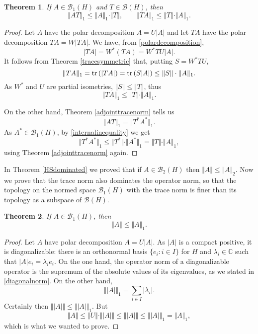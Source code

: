 \documentclass{article}
\newcommand{\tr}{\ensuremath\mathrm{tr}\,}
\newcommand{\norm}[1]{\Vert #1 \Vert}
\newtheorem{theorem}{Theorem}
\begin{document}
\begin{theorem}
If $A \in \mathscr{B}_1(H)$ and $T \in \mathscr{B}(H)$, then
\[
\norm{AT}_1 \leq \norm{A}_1 \cdot \norm{T}, \qquad \norm{TA}_1 \leq \norm{T} \cdot \norm{A}_1.
\]
\end{theorem}
\begin{proof}
Let $A$ have the polar decomposition $A=U|A|$ and let $TA$ have the polar decomposition
$TA=W|TA|$. We have, from \eqref{polardecomposition},
\[
|TA|=W^*(TA)=W^*TU|A|.
\]
It follows from Theorem \ref{tracesymmetric} that, putting $S=W^*TU$,
\[
\norm{TA}_1 = \tr(|TA|) = \tr(S|A|) \leq \norm{S}\cdot \norm{A}_1.
\]
As $W^*$ and $U$ are partial isometries, $\norm{S} \leq \norm{T}$, thus
\begin{equation}
\norm{TA}_1 \leq \norm{T} \cdot \norm{A}_1.
\label{internalinequality}
\end{equation}

On the other hand, Theorem \ref{adjointtracenorm} tells us
\[
\norm{AT}_1 = \norm{T^*A^*}_1.
\]
As $A^* \in \mathscr{B}_1(H)$, by \eqref{internalinequality} we get 
\[
\norm{T^*A^*}_1 \leq \norm{T^*} \cdot \norm{A^*}_1 = \norm{T} \cdot \norm{A}_1,
\]
 using Theorem \ref{adjointtracenorm} again.
\end{proof}


In Theorem \ref{HSdominated} we proved that if $A \in \mathscr{B}_2(H)$ then $\norm{A} \leq \norm{A}_2$. Now we prove that the trace norm also dominates the operator norm, so
that the topology on the normed space $\mathscr{B}_1(H)$ with the trace norm is finer than its topology as a subspace of $\mathscr{B}(H)$.

\begin{theorem}
If $A \in \mathscr{B}_1(H)$, then 
\[
\norm{A} \leq \norm{A}_1.
\]
\label{tracedominates}
\end{theorem}
\begin{proof}
Let $A$ have polar decomposition $A=U|A|$. As $|A|$ is a compact positive, it is diagonalizable: there is an orthonormal basis
$\{e_i : i \in I\}$ for $H$ and $\lambda_i \in \mathbb{C}$ such that $|A|e_i = \lambda_i e_i$. On the one hand, the operator norm of a diagonalizable operator
is the supremum of the absolute values of its eigenvalues, as we  stated  in \eqref{diagonalnorm}.
On the other hand,
\[
\norm{|A|}_1= \sum_{i \in I} |\lambda_i|.
\]
Certainly then $\norm{|A|} \leq \norm{|A|}_1$. But
\[
\norm{A} \leq \norm{U} \cdot \norm{|A|} \leq \norm{|A|} \leq \norm{|A|}_1 = \norm{A}_1,
\]
which is what we wanted to prove.
\end{proof}
\end{document}
